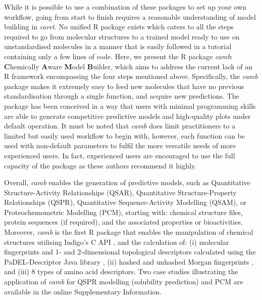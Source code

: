 \documentclass[twoside,a4wide,10pt]{article}
\begin{document}
While it is possible to use a combination of these packages to set up your own workflow, going from start to finish requires a reasonable understanding of model building in {\it caret}.
No unified R package exists which caters to all the steps required to go from molecular structures to a trained model ready to use on
unstandardised molecules in a manner that is easily followed in a tutorial containing only a few lines of code.
Here, we present the R package {\it camb}: {\bf C}hemically {\bf A}ware {\bf M}odel {\bf B}uilder,
which aims to address the current lack of an R framework encompassing the four steps mentioned above. 
Specifically, the {\it camb} package makes it extremely easy to feed new molecules that have no previous standardisation through a single function, and acquire new predictions.
The package has been conceived in a way that users with minimal programming skills are able to generate competitive predictive models and high-quality plots under default operation.
It must be noted that {\it camb} does limit practitioners to a limited but easily used workflow to begin with, however, each function can be used with non-default parameters to fulfil the more versatile needs of more experienced users. In fact, experienced users are encouraged to use the full capacity of the \citep{caret} package as these authors recommend it highly.

Overall, {\it camb} enables the generation of predictive  models,
such as 
Quantitative Structure-Activity Relationships (QSAR), 
Quantitative Structure-Property Relationships (QSPR), 
Quantitative Sequence-Activity Modelling (QSAM), 
or Proteochemometric Modelling (PCM),
starting with: chemical structure files, protein sequences (if required), and the associated properties or bioactivities.
Moreover, {\it camb} is the first R package that enables the manipulation of chemical structures utilising Indigo's C API \citep{Indigo},
and the calculation of:
(i) molecular fingerprints and 1- and 2-dimensional topological 
descriptors calculated using the PaDEL-Descriptor Java library \citep{padel},
(ii) hashed and unhashed Morgan fingerprints \citep{extended_fp},
and (iii) 8 types of amino acid descriptors. 
Two case studies illustrating the application of {\it camb} for
QSPR modelling (solubility prediction) and PCM are available in the online Supplementary Information.




\end{document}
